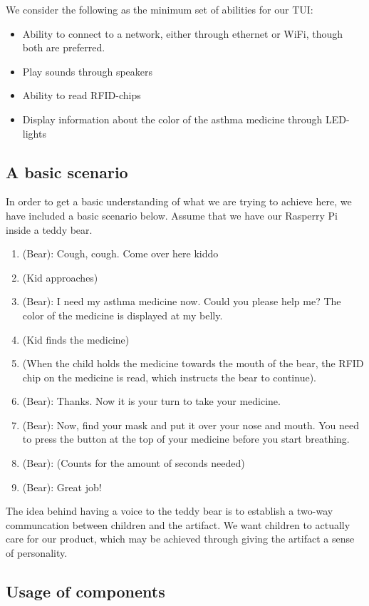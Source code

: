 We consider the following as the minimum set of abilities for our TUI:

\begin{itemize}
  \item Ability to connect to a network, either through ethernet or WiFi, though both are preferred. 
  \item Play sounds through speakers
  \item Ability to read RFID-chips
  \item Display information about the color of the asthma medicine through LED-lights
\end{itemize} 

\subsection{A basic scenario}
In order to get a basic understanding of what we are trying to achieve here, we have included a basic scenario below. Assume that we have our Rasperry Pi inside a teddy bear.  

\begin{enumerate}
  \item (Bear): Cough, cough. Come over here kiddo 
  \item (Kid approaches)
  \item (Bear): I need my asthma medicine now. Could you please help me? The color of the medicine is displayed at my belly.
  \item (Kid finds the medicine)
  \item (When the child holds the medicine towards the mouth of the bear, the RFID chip on the medicine is read, which instructs the bear to continue). 
  \item (Bear): Thanks. Now it is your turn to take your medicine. 
  \item (Bear): Now, find your mask and put it over your nose and mouth. You need to press the button at the top of your medicine before you start breathing. 
  \item (Bear): (Counts for the amount of seconds needed)
  \item (Bear): Great job!
\end{enumerate}

The idea behind having a voice to the teddy bear is to establish a two-way communcation between children and the artifact. We want children to actually care for our product, which may be achieved through giving the artifact a sense of personality. 


\subsection{Usage of components}

